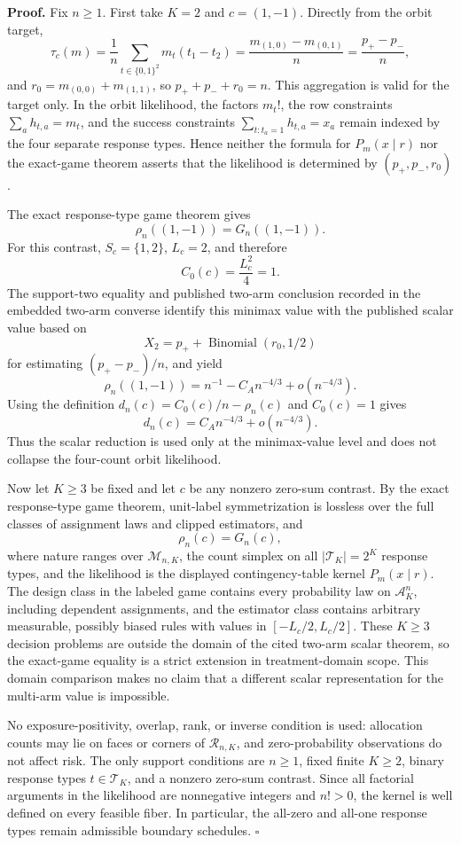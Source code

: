 \textbf{Proof.}
Fix \(n\geq 1\).  First take \(K=2\) and \(c=(1,-1)\).  Directly from the orbit target,
\[
 \tau_c(m)
 =\frac1n\sum_{t\in\{0,1\}^2}m_t(t_1-t_2)
 =\frac{m_{(1,0)}-m_{(0,1)}}n
 =\frac{p_+-p_-}{n},
\]
and \(r_0=m_{(0,0)}+m_{(1,1)}\), so \(p_++p_-+r_0=n\).  This aggregation is valid for the target only.  In the orbit likelihood, the factors \(m_t!\), the row constraints \(\sum_a h_{t,a}=m_t\), and the success constraints \(\sum_{t:t_a=1}h_{t,a}=x_a\) remain indexed by the four separate response types.  Hence neither the formula for \(P_m(x\mid r)\) nor the exact-game theorem asserts that the likelihood is determined by \((p_+,p_-,r_0)\).

The exact response-type game theorem gives
\[
 \rho_n((1,-1))=G_n((1,-1)).
\]
For this contrast, \(S_c=\{1,2\}\), \(L_c=2\), and therefore
\[
 C_0(c)=\frac{L_c^2}{4}=1.
\]
The support-two equality and published two-arm conclusion recorded in the embedded two-arm converse identify this minimax value with the published scalar value based on
\[
 X_2=p_++\operatorname{Binomial}(r_0,1/2)
\]
for estimating \((p_+-p_-)/n\), and yield
\[
 \rho_n((1,-1))
 =n^{-1}-C_A n^{-4/3}+o(n^{-4/3}).
\]
Using the definition \(d_n(c)=C_0(c)/n-\rho_n(c)\) and \(C_0(c)=1\) gives
\[
 d_n(c)=C_A n^{-4/3}+o(n^{-4/3}).
\]
Thus the scalar reduction is used only at the minimax-value level and does not collapse the four-count orbit likelihood.

Now let \(K\geq3\) be fixed and let \(c\) be any nonzero zero-sum contrast.  By the exact response-type game theorem, unit-label symmetrization is lossless over the full classes of assignment laws and clipped estimators, and
\[
 \rho_n(c)=G_n(c),
\]
where nature ranges over \(\mathcal M_{n,K}\), the count simplex on all \(|\mathcal T_K|=2^K\) response types, and the likelihood is the displayed contingency-table kernel \(P_m(x\mid r)\).  The design class in the labeled game contains every probability law on \(\mathcal A_K^n\), including dependent assignments, and the estimator class contains arbitrary measurable, possibly biased rules with values in \([-L_c/2,L_c/2]\).  These \(K\geq3\) decision problems are outside the domain of the cited two-arm scalar theorem, so the exact-game equality is a strict extension in treatment-domain scope.  This domain comparison makes no claim that a different scalar representation for the multi-arm value is impossible.

No exposure-positivity, overlap, rank, or inverse condition is used: allocation counts may lie on faces or corners of \(\mathcal R_{n,K}\), and zero-probability observations do not affect risk.  The only support conditions are \(n\geq1\), fixed finite \(K\geq2\), binary response types \(t\in\mathcal T_K\), and a nonzero zero-sum contrast.  Since all factorial arguments in the likelihood are nonnegative integers and \(n!>0\), the kernel is well defined on every feasible fiber.  In particular, the all-zero and all-one response types remain admissible boundary schedules.  \(\square\)